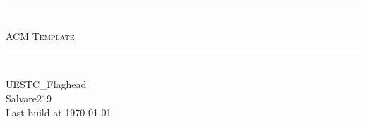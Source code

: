 \begin{titlepage}
	\pagestyle{empty}
	
  \begin{center}
		~\\[80pt]
    \hrule\ \\[8pt]
    \fontsize{48pt}{\baselineskip}\selectfont  \textsc{ACM Template}\\[8pt]
    \hrule\ \\[150pt]
    \selectfont UESTC\_Flaghead \\[250pt]
    \huge Salvare219\\[8pt]
    \Large Last build at \today
  \end{center}
\end{titlepage}
\restoregeometry

